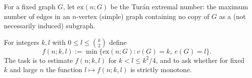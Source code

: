 For a fixed graph $G$, let $\mathrm{ex}(n;G)$ be the Tur\'an extremal number: the maximum number of edges in an
$n$-vertex (simple) graph containing no copy of $G$ as a (not necessarily induced) subgraph.

For integers $k,l$ with $0\le l\le \binom{k}{2}$ define
\[
f(n;k,l):=\min\{\mathrm{ex}(n;G): v(G)=k,\ e(G)=l\}.
\]
The task is to estimate $f(n;k,l)$ for $k<l\le k^2/4$, and to ask whether for fixed $k$ and large $n$ the function
$l\mapsto f(n;k,l)$ is strictly monotone.
